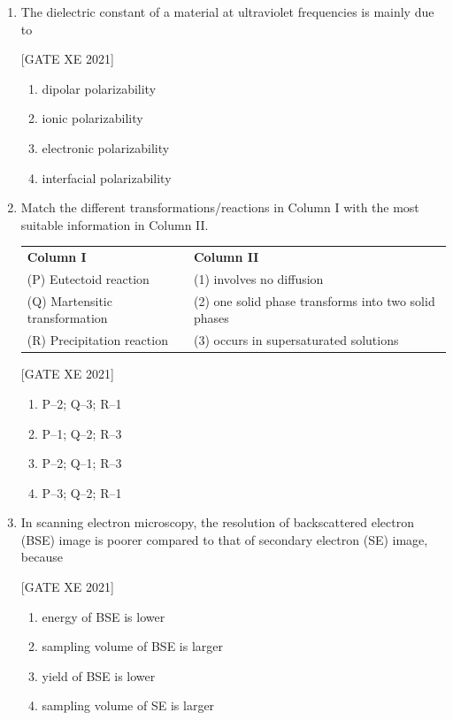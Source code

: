 \documentclass[journal,12pt,onecolumn]{IEEEtran}
\theoremstyle{remark}
\begin{document}
\begin{enumerate}
\item The dielectric constant of a material at ultraviolet frequencies is mainly due to

\hfill[GATE XE 2021]

\begin{multicols}{2}
\begin{enumerate}
\item dipolar polarizability
\item ionic polarizability
\item electronic polarizability
\item interfacial polarizability
\end{enumerate}
\end{multicols}

\item Match the different transformations/reactions in Column I with the most suitable information in Column II. 

\begin{center}
\begin{tabular}{p{6cm} p{6cm}}
\textbf{Column I} & \textbf{Column II} \\
(P) Eutectoid reaction & (1) involves no diffusion \\
(Q) Martensitic transformation & (2) one solid phase transforms into two solid phases \\
(R) Precipitation reaction & (3) occurs in supersaturated solutions \\
\end{tabular}
\end{center}

\hfill[GATE XE 2021]

\begin{multicols}{2}
\begin{enumerate}
\item P–2; Q–3; R–1
\item P–1; Q–2; R–3
\item P–2; Q–1; R–3
\item P–3; Q–2; R–1
\end{enumerate}
\end{multicols}

\item In scanning electron microscopy, the resolution of backscattered electron (BSE) image is poorer compared to that of secondary electron (SE) image, because

\hfill[GATE XE 2021]

\begin{multicols}{2}
\begin{enumerate}
\item energy of BSE is lower
\item sampling volume of BSE is larger
\item yield of BSE is lower
\item sampling volume of SE is larger
\end{enumerate}
\end{multicols}


\end{enumerate}
\end{document}
